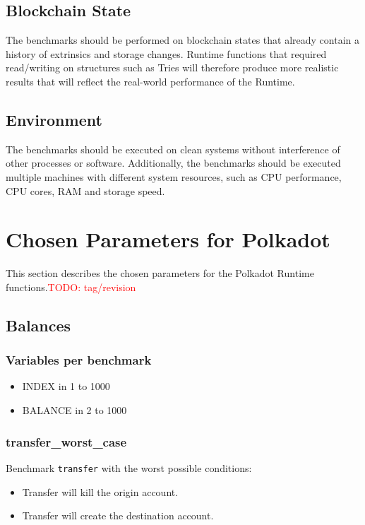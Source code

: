 \documentclass[11pt,a4paper]{article}
\newcommand{\todo}[1]{\textcolor{red}{TODO: #1}}
\begin{document}
\subsection{Blockchain State}
The benchmarks should be performed on blockchain states that already contain a history of
extrinsics and storage changes. Runtime functions that required read/writing on structures
such as Tries will therefore produce more realistic results that will reflect the real-world
performance of the Runtime.

\subsection{Environment}
The benchmarks should be executed on clean systems without interference of other processes
or software. Additionally, the benchmarks should be executed multiple machines with different
system resources, such as CPU performance, CPU cores, RAM and storage speed.

\section{Chosen Parameters for Polkadot}
This section describes the chosen parameters for the Polkadot Runtime functions.\todo{tag/revision}

\subsection{Balances}

\subsubsection*{Variables per benchmark}
\begin{itemize}
\item INDEX in 1 to 1000
\item BALANCE in 2 to 1000
\end{itemize}

\subsubsection{transfer\_worst\_case}

Benchmark \verb|transfer| with the worst possible conditions:
\begin{itemize}
\item Transfer will kill the origin account.
\item Transfer will create the destination account.
\end{itemize}
\end{document}
